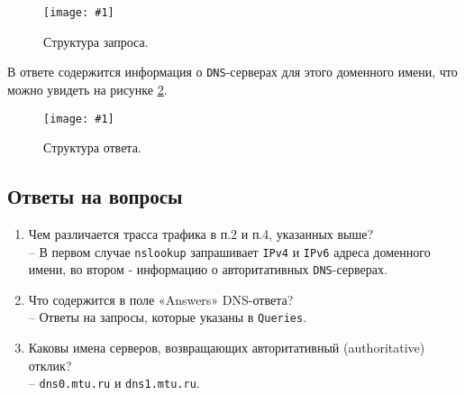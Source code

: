 \documentclass[12pt, a4paper]{article}
\newcommand{\figc}[4]{
  \begin{figure}[H]
  \begin{center}
    \texttt{[image: \#1]}
    \caption{#2}
    \label{fig:#3}
  \end{center}
  \end{figure}
}
\begin{document}
\figc{nslookup_ns_req}{Структура запроса.}{ns_ns_rq}{2.5}

В ответе содержится информация о \texttt{DNS}-серверах для этого доменного
имени, что можно увидеть на рисунке \ref{fig:ns_ns_rs}.

\figc{nslookup_ns_res}{Структура ответа.}{ns_ns_rs}{2.5}

\subsection{Ответы на вопросы}

\begin{enumerate}
  \item Чем различается трасса трафика в п.2 и п.4, указанных выше?\\
    -- В первом случае \texttt{nslookup} запрашивает \texttt{IPv4} и \texttt{IPv6}
    адреса доменного имени, во втором - информацию о авторитативных
    \texttt{DNS}-серверах.
  \item Что содержится в поле «Answers» DNS-ответа?\\
    -- Ответы на запросы, которые указаны в \texttt{Queries}.
  \item Каковы имена серверов, возвращающих авторитативный (authoritative) отклик?\\
    -- \texttt{dns0.mtu.ru} и \texttt{dns1.mtu.ru}.
\end{enumerate}
\end{document}
